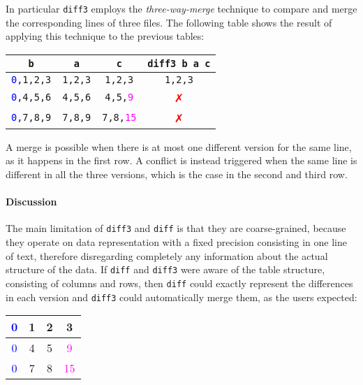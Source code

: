 \documentclass[preprint]{sigplanconf}
\begin{document}
In particular \texttt{diff3} employs the \emph{three-way-merge} technique to compare and merge the corresponding lines of three files. The following table shows the result of applying this technique to the previous tables:
\begin{center}
\begin{tabular}{| c | c | c | c |}
\hline
\texttt{b} & \texttt{a} & \texttt{c} & \texttt{diff3 b a c} \\ \hline
\texttt{\textcolor{blue}{0},1,2,3} & \texttt{1,2,3} & \texttt{1,2,3} & \textcolor{dgreen}{\texttt{1,2,3}} \\ \hline
\texttt{\textcolor{blue}{0},4,5,6} & \texttt{4,5,6} & \texttt{4,5,\textcolor{magenta}{9}} & \textcolor{red}{✗}  \\ \hline
\texttt{\textcolor{blue}{0},7,8,9} & \texttt{7,8,9} & \texttt{7,8,\textcolor{magenta}{15}} & \textcolor{red}{✗} \\ \hline
\end{tabular}
\end{center}
A merge is possible when there is at most one different version for the same line, as it happens in the first row.
A conflict is instead triggered when the same line is different in all the three versions, which is the case in the second and third row.


\paragraph{Discussion}
The main limitation of \texttt{diff3} and \texttt{diff} is that they are  coarse-grained, because they operate on data representation with a fixed precision consisting in one line of text, therefore disregarding completely any information about the actual structure of the data.
If \texttt{diff} and \texttt{diff3} were aware of the table structure, consisting of columns and rows, then \texttt{diff} could exactly represent the differences in each version and \texttt{diff3} could automatically merge them, as the users expected:
\begin{center}
\begin{tabular}{| c | c | c | c |}
\hline
\textcolor{blue}{0} & 1 & 2 & 3 \\ \hline
\textcolor{blue}{0} & 4 & 5 & \textcolor{magenta}{9} \\ \hline
\textcolor{blue}{0} & 7 & 8 & \textcolor{magenta}{15} \\ \hline
\end{tabular}
\end{center}
\end{document}
